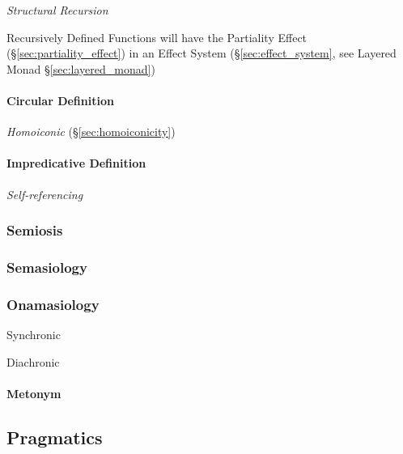 \emph{Structural Recursion}

Recursively Defined Functions will have the Partiality Effect
(\S\ref{sec:partiality_effect}) in an Effect System
(\S\ref{sec:effect_system}, see Layered Monad
\S\ref{sec:layered_monad})



\paragraph{Circular Definition}\label{sec:circular_definition}\hfill

\emph{Homoiconic} (\S\ref{sec:homoiconicity})



\paragraph{Impredicative Definition}\label{sec:impredicative_definition}\hfill

\emph{Self-referencing}



\subsubsection{Semiosis}\label{sec:semiosis}

\subsubsection{Semasiology}\label{sec:semasiology}

\subsubsection{Onamasiology}\label{sec:onamasiology}

Synchronic

Diachronic

\paragraph{Metonym}\label{sec:metonym}\hfill



\subsection{Pragmatics}\label{sec:pragmatics}

